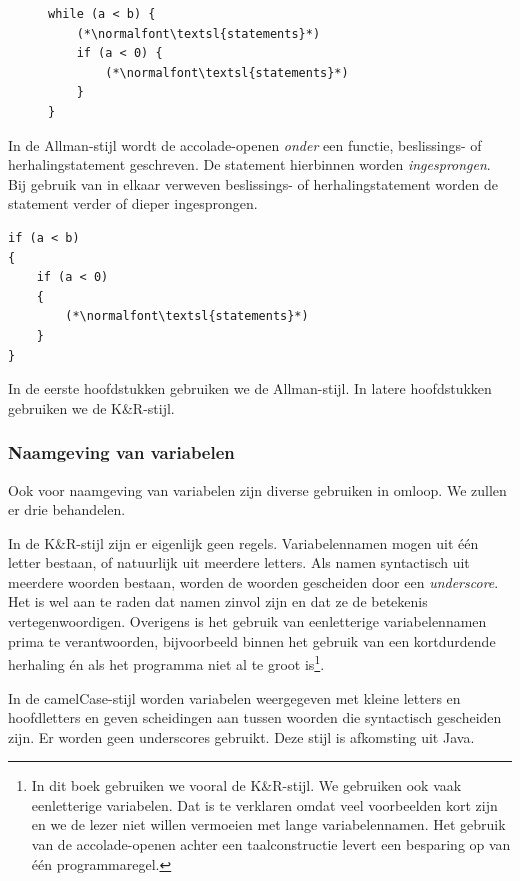 \begin{figure}[!ht]
\begin{lstlisting}[caption=K\&R-stijl.]
while (a < b) {
    (*\normalfont\textsl{statements}*)
    if (a < 0) {
        (*\normalfont\textsl{statements}*)
    }
}
\end{lstlisting}

\end{figure}
In de Allman-stijl wordt de accolade-openen \textsl{onder} een functie, beslissings- of herhalingstatement geschreven. De statement hierbinnen worden \textsl{ingesprongen}. Bij gebruik van in elkaar verweven beslissings- of herhalingstatement worden de statement verder of dieper ingesprongen.

\begin{lstlisting}[caption=Allman-stijl.]
if (a < b)
{
    if (a < 0)
    {
        (*\normalfont\textsl{statements}*)
    }
}
\end{lstlisting}

In de eerste hoofdstukken gebruiken we de Allman-stijl. In latere hoofdstukken gebruiken we de K\&R-stijl.

\subsubsection*{Naamgeving van variabelen}

Ook voor naamgeving van variabelen zijn diverse gebruiken in omloop. We zullen er drie behandelen.

In de K\&R-stijl zijn er eigenlijk geen regels. Variabelennamen mogen uit één letter bestaan, of natuurlijk uit meerdere letters. Als namen syntactisch uit meerdere woorden bestaan, worden de woorden gescheiden door een \textsl{underscore}. Het is wel aan te raden dat namen zinvol zijn en dat ze de betekenis vertegenwoordigen. Overigens is het gebruik van eenletterige variabelennamen prima te verantwoorden, bijvoorbeeld binnen het gebruik van een kortdurdende herhaling én als het programma niet al te groot is\footnote{In dit boek gebruiken we vooral de K\&R-stijl. We gebruiken ook vaak eenletterige variabelen. Dat is te verklaren omdat veel voorbeelden kort zijn en we de lezer niet willen vermoeien met lange variabelennamen. Het gebruik van de accolade-openen achter een taalconstructie levert een besparing op van één programmaregel.}.

In de camelCase-stijl worden variabelen weergegeven met kleine letters en hoofdletters en geven scheidingen aan tussen woorden die syntactisch gescheiden zijn. Er worden geen underscores gebruikt. Deze stijl is afkomsting uit Java.

